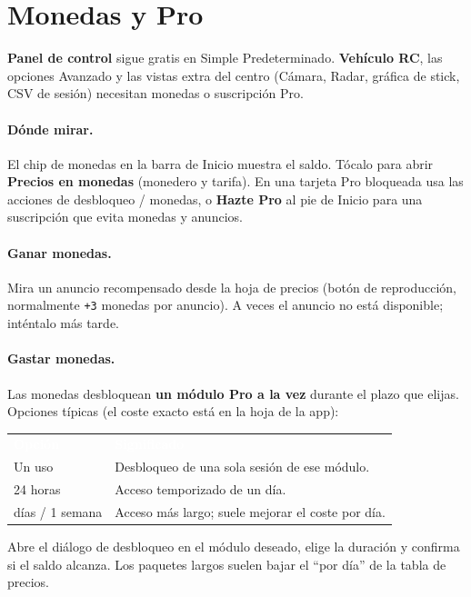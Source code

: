 \documentclass[12pt,a4paper]{article}
\newcommand{\thc}[1]{\textcolor{white}{\bfseries #1}}
\newcommand{\ui}[1]{\textsf{\textbf{#1}}}
\begin{document}
\section{Monedas y Pro}
\label{sec:coins}

\ui{Panel de control} sigue gratis en Simple Predeterminado.
\ui{Vehículo RC}, las opciones Avanzado y las vistas extra del centro
(Cámara, Radar, gráfica de stick, CSV de sesión) necesitan monedas o
suscripción Pro.

\paragraph{Dónde mirar.}
El chip de monedas en la barra de Inicio muestra el saldo.
Tócalo para abrir \ui{Precios en monedas} (monedero y tarifa).
En una tarjeta Pro bloqueada usa las acciones de desbloqueo / monedas, o
\ui{Hazte Pro} al pie de Inicio para una suscripción que evita monedas y
anuncios.

\paragraph{Ganar monedas.}
Mira un anuncio recompensado desde la hoja de precios (botón de reproducción,
normalmente \texttt{+3} monedas por anuncio). A veces el anuncio no está
disponible; inténtalo más tarde.

\paragraph{Gastar monedas.}
Las monedas desbloquean \textbf{un módulo Pro a la vez} durante el plazo
que elijas. Opciones típicas (el coste exacto está en la hoja de la app):

\begin{center}
\renewcommand{\arraystretch}{1.15}
\begin{tabular}{>{\raggedright\arraybackslash}p{3.2cm}
                >{\raggedright\arraybackslash}p{8.2cm}}
\rowcolor{TblHead}
\thc{Opción} & \thc{Significado} \\
Un uso & Desbloqueo de una sola sesión de ese módulo. \\
\rowcolor{TblTelem}
24 horas & Acceso temporizado de un día. \\
3 días / 1 semana & Acceso más largo; suele mejorar el coste por día. \\
\end{tabular}
\end{center}

Abre el diálogo de desbloqueo en el módulo deseado, elige la duración y
confirma si el saldo alcanza. Los paquetes largos suelen bajar el
``por día'' de la tabla de precios.
\end{document}
